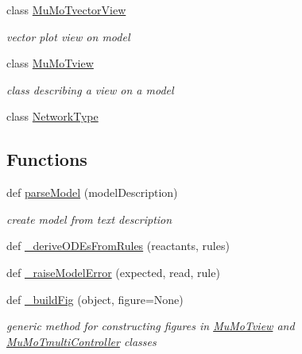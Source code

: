 \begin{DoxyCompactItemize}
class \hyperlink{class_mu_mo_t_1_1_mu_mo_tvector_view}{Mu\+Mo\+Tvector\+View}
\begin{DoxyCompactList}\small\item\em vector plot view on model \end{DoxyCompactList}\item 
class \hyperlink{class_mu_mo_t_1_1_mu_mo_tview}{Mu\+Mo\+Tview}
\begin{DoxyCompactList}\small\item\em class describing a view on a model \end{DoxyCompactList}\item 
class \hyperlink{class_mu_mo_t_1_1_network_type}{Network\+Type}
\end{DoxyCompactItemize}
\subsection*{Functions}
\begin{DoxyCompactItemize}
\item 
def \hyperlink{namespace_mu_mo_t_a563aad4a460dbcc0705cf99bb6f6dd5d}{parse\+Model} (model\+Description)
\begin{DoxyCompactList}\small\item\em create model from text description \end{DoxyCompactList}\item 
def \hyperlink{namespace_mu_mo_t_a276566fb102dd4e4bf32a9ba4fb8a09b}{\+\_\+derive\+O\+D\+Es\+From\+Rules} (reactants, rules)
\item 
def \hyperlink{namespace_mu_mo_t_a07dd350ff74bc1abafd7f44f972089a2}{\+\_\+raise\+Model\+Error} (expected, read, rule)
\item 
def \hyperlink{namespace_mu_mo_t_a4cf5ca1427b0999c933587bfaa89936d}{\+\_\+build\+Fig} (object, figure=None)
\begin{DoxyCompactList}\small\item\em generic method for constructing figures in \hyperlink{class_mu_mo_t_1_1_mu_mo_tview}{Mu\+Mo\+Tview} and \hyperlink{class_mu_mo_t_1_1_mu_mo_tmulti_controller}{Mu\+Mo\+Tmulti\+Controller} classes \end{DoxyCompactList}\end{DoxyCompactItemize}
